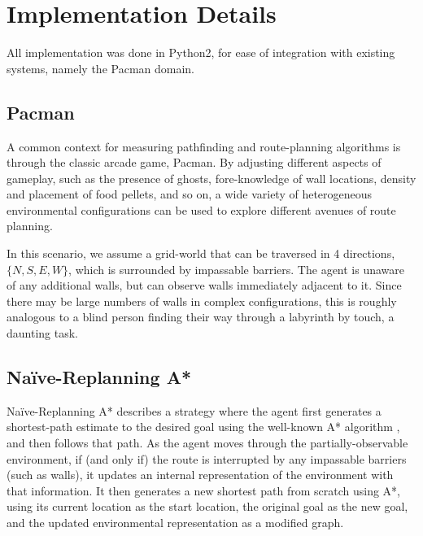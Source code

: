 
\section{Implementation Details}\label{sec:implementation}

	All implementation was done in Python2, for ease of integration with existing systems, namely the Pacman domain. 

\subsection{Pacman}

	A common context for measuring pathfinding and route-planning algorithms is through the classic arcade game, Pacman. By adjusting different aspects of gameplay, such as the presence of ghosts, fore-knowledge of wall locations, density and placement of food pellets, and so on, a wide variety of heterogeneous environmental configurations can be used to explore different avenues of route planning.
	
	In this scenario, we assume a grid-world that can be traversed in 4 directions, $\{N, S, E, W\}$, which is surrounded by impassable barriers. The agent is unaware of any additional walls, but can observe walls immediately adjacent to it. Since there may be large numbers of walls in complex configurations, this is roughly analogous to a blind person finding their way through a labyrinth by touch, a daunting task.

\subsection{Naïve-Replanning A*}

	Naïve-Replanning A* describes a strategy where the agent first generates a shortest-path estimate to the desired goal using the well-known A* algorithm \cite{hart1968formal}, and then follows that path. As the agent moves through the partially-observable environment, if (and only if) the route is interrupted by any impassable barriers (such as walls), it updates an internal representation of the environment with that information. It then generates a new shortest path from scratch using A*, using its current location as the start location, the original goal as the new goal, and the updated environmental representation as a modified graph.
	
